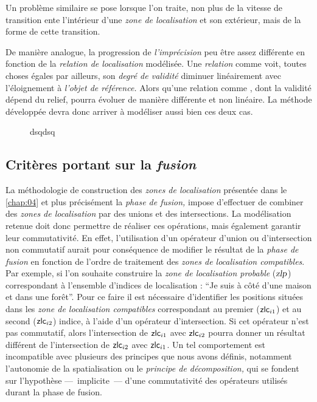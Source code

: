 
Un problème similaire se pose lorsque l'on traite, non plus de la
vitesse de transition ente l'intérieur d'une \emph{zone de
  localisation} et son extérieur, mais de la forme de cette
transition.

De manière analogue, la progression de \emph{l'imprécision} peu être
assez différente en fonction de la \emph{relation de localisation}
modélisée. Une \emph{relation} comme  voit, toutes
choses égales par ailleurs, son \textsl{degré de validité} diminuer
linéairement avec l'éloignement à \emph{l'objet de référence.} Alors
qu'une relation comme , dont
la validité dépend du relief, pourra évoluer de manière différente et
non linéaire.
%
La méthode développée devra donc arriver à modéliser aussi bien ces
deux cas.


\begin{figure}
  \centering
  
  \caption{dsqdsq}
  \label{fig:temp}
\end{figure}


\subsection{Critères portant sur la \emph{fusion}}



La méthodologie de construction des \emph{zones de localisation}
présentée dans le \autoref{chap:04} et plus précisément la \emph{phase
  de fusion,} impose d'effectuer de combiner des \emph{zones de
  localisation} par des unions et des intersections. La modélisation
retenue doit donc permettre de réaliser ces opérations, mais également
garantir leur commutativité. En effet, l'utilisation d'un opérateur
d'union ou d'intersection non commutatif aurait pour conséquence de
modifier le résultat de la \emph{phase de fusion} en fonction de
l'ordre de traitement des \emph{zones de localisation
  compatibles}. Par exemple, si l'on souhaite construire la \emph{zone
  de localisation probable} ($\text{\textsl{zlp}}$) correspondant à
l'ensemble d'indices de localisation : \enquote{Je suis à côté d'une
  maison et dans une forêt}. Pour ce faire il est nécessaire
d'identifier les positions situées dans les \emph{zone de localisation
  compatibles} correspondant au premier ($\text{\textsf{zlc}}_{i1}$)
et au second ($\text{\textsf{zlc}}_{i2}$) indice, à l'aide d'un
opérateur d'intersection. Si cet opérateur n'est pas commutatif, alors
l'intersection de $\text{\textsf{zlc}}_{i1}$ avec
$\text{\textsf{zlc}}_{i2}$ pourra donner un résultat différent de
l'intersection de $\text{\textsf{zlc}}_{i2}$ avec
$\text{\textsf{zlc}}_{i1}$. Un tel comportement est incompatible avec
plusieurs des principes que nous avons définis, notamment l'autonomie
de la spatialisation ou le \emph{principe de décomposition,} qui se
fondent sur l'hypothèse ---~implicite~--- d'une commutativité des
opérateurs utilisés durant la phase de fusion.

